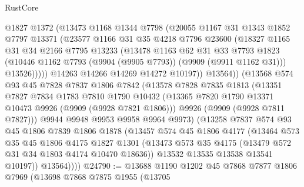 \begin{lexlean}{RustCore}
\begin{coremodule}
                @1827
                @1372
                (@13473
                  @1168
                  @1344
                  @7798
                  (@20055
                    @1167
                    @31
                    @1343
                    @1852
                    @7797
                    @13371
                    (@23577
                      @1166
                      @31
                      @35
                      @4218
                      @7796
                      @23600
                      (@18327
                        @1165
                        @31
                        @34
                        @2166
                        @7795
                        @13233
                        (@13478
                          @1163
                          @62
                          @31
                          @33
                          @7793
                          @1823
                          (@10446 @1162 @7793 (@9904 (@9905 @7793)) (@9909 (@9911 @1162 @31)))
                          @13526)))))
                @14263
                @14266
                @14269
                @14272
                @10197))
            @13564))
        (@13568
          @574
          @93
          @45
          @7828
          @7837
          @1806
          @7842
          (@13578
            @7828
            @7835
            @1813
            (@13351
              @7827
              @7834
              @1783
              @7810
              @1790
              @10432
              (@13365 @7820 @1790 @13371 @10473 @9926 (@9909 (@9928 @7821 @1806)))
              @9926
              (@9909 (@9928 @7811 @7827)))
            @9944
            @9948
            @9953
            @9958
            @9964
            @9973)
          (@13258
            @7837
            @574
            @93
            @45
            @1806
            @7839
            @1806
            @1878
            (@13457
              @574
              @45
              @1806
              @4177
              (@13464
                @573
                @35
                @45
                @1806
                @4175
                @1827
                @1301
                (@13473 @573 @35 @4175 (@13479 @572 @31 @34 @1803 @4174 @10470 @18636))
                @13532
                @13535
                @13538
                @13541
                @10197))
            @13564))))
@24790 := @13688
    @1190
    @1202
    @45
    @7868
    @7877
    @1806
    @7969
    (@13698
      @7868
      @7875
      @1955
      (@13705

\end{coremodule}
\end{lexlean}
